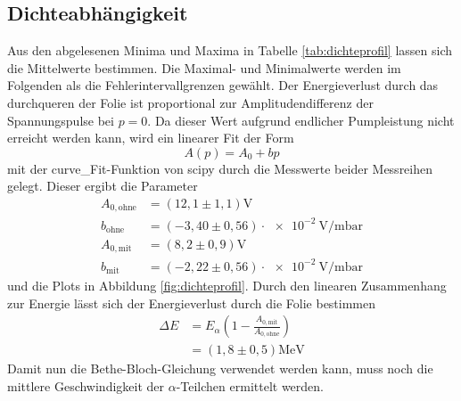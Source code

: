 %
\subsection{Dichteabhängigkeit}
Aus den abgelesenen Minima und Maxima in Tabelle \ref{tab:dichteprofil} lassen sich die Mittelwerte bestimmen.
Die Maximal- und Minimalwerte werden im Folgenden als die Fehlerintervallgrenzen gewählt.
Der Energieverlust durch das durchqueren der Folie ist proportional zur Amplitudendifferenz der Spannungspulse bei $p=0$.
Da dieser Wert aufgrund endlicher Pumpleistung nicht erreicht werden kann,
wird ein linearer Fit der Form
\begin{equation}
  A(p) = A_0 + bp
\end{equation}
mit der curve\_Fit-Funktion von scipy \cite{scipy} durch die Messwerte beider Messreihen gelegt.
Dieser ergibt die Parameter
\begin{align}
  A_{0,\text{ohne}} &= (12,1 \pm 1,1)\si{\volt}\\
  b_{\text{ohne}}   &= (-3,40 \pm 0,56)\cdot\SI{e-2}{\volt\per\milli\bar}\\
  A_{0,\text{mit}} &= (8,2 \pm 0,9)\si{\volt}\\
  b_{\text{mit}}   &= (-2,22 \pm 0,56)\cdot\SI{e-2}{\volt\per\milli\bar}
\end{align}
und die Plots in Abbildung \ref{fig:dichteprofil}.
Durch den linearen Zusammenhang zur Energie lässt sich der Energieverlust durch die Folie bestimmen
\begin{align}
  \Delta E &= E_{\alpha}\left(1-\frac{A_{0,\text{mit}}}{A_{0,\text{ohne}}}\right)\\
           &= (1,8 \pm 0,5)\si{\mega\electronvolt}
\end{align}
Damit nun die Bethe-Bloch-Gleichung verwendet werden kann, muss noch die mittlere Geschwindigkeit der $\alpha$-Teilchen ermittelt werden.
